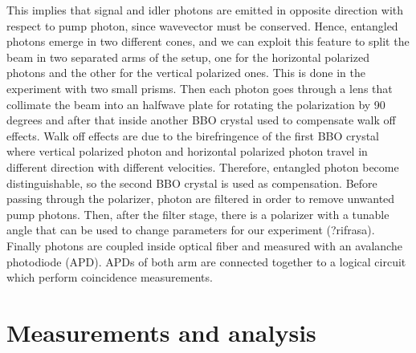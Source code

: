 \documentclass[a4paper,10pt]{article}
\begin{document}
This implies that signal and idler photons are emitted in opposite direction with respect to pump photon, since wavevector must be conserved. Hence, entangled photons emerge in two different cones, and we can exploit this feature to split the beam in two separated arms of the setup, one for the horizontal polarized photons and the other for the vertical polarized ones. This is done in the experiment with two small prisms. Then each photon goes through a lens that collimate the beam into an halfwave plate for rotating the polarization by 90 degrees and after that inside another BBO crystal used to compensate walk off effects. Walk off effects are due to the birefringence of the first BBO crystal where vertical polarized photon and horizontal polarized photon travel in different direction with different velocities. Therefore, entangled photon become distinguishable, so the second BBO crystal is used as compensation. Before passing through the polarizer, photon are filtered in order to remove unwanted pump photons. Then, after the filter stage, there is a polarizer with a tunable angle that can be used to change parameters for our experiment (?rifrasa). Finally photons are coupled inside optical fiber and measured with an avalanche photodiode (APD). APDs of both arm are connected together to a logical circuit which perform coincidence measurements. 

\section{Measurements and analysis}
\end{document}
